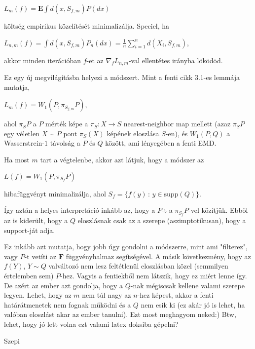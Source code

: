 \documentclass[a4paper]{article}
\newcommand{\cF}{\mathbf{F}}
\newcommand{\EE}{\mathbf{E}}
\begin{document}
$L_m(f) = \EE{\int d(x, S_{f,m} ) P(dx)}$

költség empirikus közelítését minimalizálja. Speciel, ha

$L_{n,m}(f) = \int d(x, S_{f,m} ) P_n(dx) = \frac1n \sum_{i=1}^n d(X_i, S_{f,m} )$,

akkor minden iterációban $f$-et az $\nabla_f L_{n,m}$-val ellentétes irányba löködöd.

Ez egy új megvilágításba helyezi a módszert.
Mint a fenti cikk 3.1-es lemmája mutatja,

$L_m(f) = W_1(P, \pi_{S_{f,m}} P )$,

ahol $\pi_S P$ a $P$ mérték képe a $\pi_S: X \to S$ nearest-neighbor map mellett (azaz $\pi_S P$ egy véletlen $X\sim P$ pont $\pi_S(X)$ képének eloszlása $S$-en), és $W_1(P,Q)$ a Wasserstrein-$1$ távolság a $P$ és $Q$ között, ami lényegében a fenti EMD.

Ha most $m$ tart a végtelenbe, akkor azt látjuk, hogy a módszer az

$L(f) = W_1(P,\pi_{S_f}P)$

hibafüggvényt minimalizálja, ahol $S_f = \{ f(y)\,:\, y\in \mathrm{supp}(Q) \}$.

Így aztán a helyes interpretáció inkább az, hogy a $P$-t a $\pi_{S_f} P$-vel közítjük. Ebből az is kiderült, hogy a $Q$ eloszlásnak csak az a szerepe (aszimptotikusan), hogy a support-ját adja.

Ez inkább azt mutatja, hogy jobb úgy gondolni a módszerre, mint ami "filterez", vagy $P$-t vetíti az $\cF$ függvényhalmaz segítségével.
A másik következmény, hogy az $f(Y)$, $Y\sim Q$ valváltozó nem lesz feltétlenül eloszlásban közel (semmilyen értelemben sem) $P$-hez.
Vagyis a fentiekből nem látszik, hogy ez miért lenne így. De azért az ember azt gondolja, hogy a $Q$-nak mégiscsak kellene valami szerepe legyen. Lehet, hogy az $m$ nem túl nagy az $n$-hez képest, akkor a fenti határátmenetek nem fognak működni és a $Q$ nem esik ki (ez akár jó is lehet, ha valóban eloszlást akar az ember tanulni). Ezt most meghagyom neked:) Btw, lehet, hogy jó lett volna ezt valami latex doksiba gépelni?

Szepi
\end{document}

